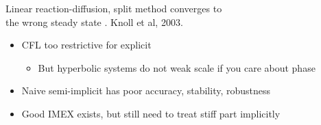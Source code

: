 \begin{frame}[shrink=10]
\begin{columns}
\begin{column}{0.5\textwidth}
      \scriptsize{Linear reaction-diffusion, split method converges to \\
        the wrong steady state . Knoll et al, 2003.}
      \begin{itemize}\small
      \item CFL too restrictive for explicit
        \begin{itemize}
        \item But hyperbolic systems do not weak scale if you care about phase
        \end{itemize}
      \item Naive semi-implicit has poor accuracy, stability, robustness
      \item Good IMEX exists, but still need to treat stiff part implicitly
      \end{itemize}
    \end{column}
  \end{columns}
\end{frame}
